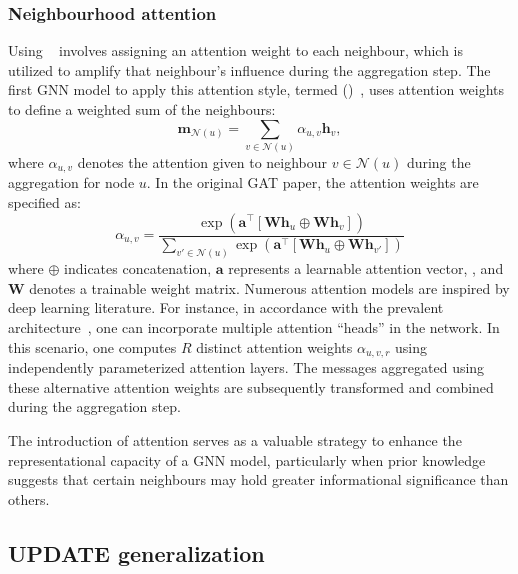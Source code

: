\subsubsection{Neighbourhood attention}\label{sec:neighbourhoodAttention}
Using ~\cite{Vaswani2017attentionIsAllYouNeed} involves assigning an attention weight to each neighbour, which is utilized to amplify that neighbour's influence during the aggregation step. The first GNN model to apply this attention style, termed  ()~\cite{Velivckovic2017graphAttentionNetworks}, uses attention weights to define a weighted sum of the neighbours:
\begin{equation*}
    \mathbf{m}_{\mathcal{N}(u)} = \sum_{v\in\mathcal{N}(u)} \alpha_{u,v}\mathbf{h}_v,
\end{equation*}
where $ \alpha_{u,v} $ denotes the attention given to neighbour $ v \in \mathcal{N}(u) $ during the aggregation for node $ u $. In the original GAT paper, the attention weights are specified as:
\begin{equation*}
    \alpha_{u,v} = \frac{\exp(\mathbf{a}^\top[\mathbf{W}\mathbf{h}_u \oplus \mathbf{W}\mathbf{h}_v])}{\sum_{v'\in\mathcal{N}(u)} \exp(\mathbf{a}^\top[\mathbf{W}\mathbf{h}_u \oplus \mathbf{W}\mathbf{h}_{v'}])}
\end{equation*}
where $ \oplus $ indicates concatenation, $ \mathbf{a} $ represents a learnable attention vector, , and $ \mathbf{W} $ denotes a trainable weight matrix.
Numerous attention models are inspired by deep learning literature. For instance, in accordance with the prevalent  architecture~\cite{Vaswani2017attentionIsAllYouNeed}, one can incorporate multiple attention ``heads'' in the network. In this scenario, one computes $ R $ distinct attention weights $ \alpha_{u,v,r} $ using independently parameterized attention layers. The messages aggregated using these alternative attention weights are subsequently transformed and combined during the aggregation step.

\medskip
The introduction of attention serves as a valuable strategy to enhance the representational capacity of a GNN model, particularly when prior knowledge suggests that certain neighbours may hold greater informational significance than others.

\subsection{UPDATE generalization}

